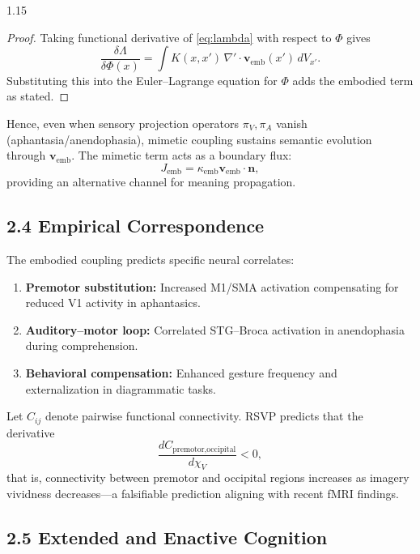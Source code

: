 \documentclass[12pt,a4paper]{article}
\begin{document}
\begin{spacing}{1.15}
\begin{proof}
Taking functional derivative of \eqref{eq:lambda} with respect to \(\Phi\) gives
\[
\frac{\delta \Lambda}{\delta \Phi(x)} = \int K(x,x')\, \nabla'\!\cdot \boldsymbol{v}_{\mathrm{emb}}(x')\, dV_{x'}.
\]
Substituting this into the Euler–Lagrange equation for \(\Phi\) adds the embodied term as stated.
\end{proof}

Hence, even when sensory projection operators \(\pi_V,\pi_A\) vanish (aphantasia/anendophasia), mimetic coupling sustains semantic evolution through \(\boldsymbol{v}_{\mathrm{emb}}\).  
The mimetic term acts as a boundary flux:
\[
J_{\mathrm{emb}} = \kappa_{\mathrm{emb}} \boldsymbol{v}_{\mathrm{emb}} \cdot \mathbf{n},
\]
providing an alternative channel for meaning propagation.

\subsection{2.4 Empirical Correspondence}

The embodied coupling predicts specific neural correlates:

\begin{enumerate}[leftmargin=1.2em]
\item \textbf{Premotor substitution:} Increased M1/SMA activation compensating for reduced V1 activity in aphantasics.  
\item \textbf{Auditory–motor loop:} Correlated STG–Broca activation in anendophasia during comprehension.  
\item \textbf{Behavioral compensation:} Enhanced gesture frequency and externalization in diagrammatic tasks.  
\end{enumerate}

Let \(C_{ij}\) denote pairwise functional connectivity.  
RSVP predicts that the derivative
\[
\frac{dC_{\text{premotor,occipital}}}{d\chi_V} < 0,
\]
that is, connectivity between premotor and occipital regions increases as imagery vividness decreases—a falsifiable prediction aligning with recent fMRI findings.

\subsection{2.5 Extended and Enactive Cognition}


\end{spacing}
\end{document}
